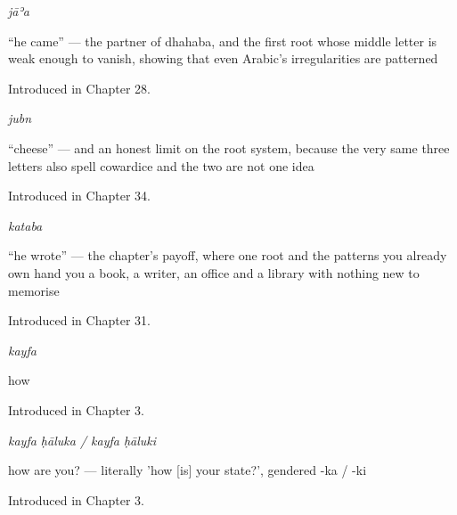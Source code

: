 \noindent\begin{minipage}[t]{\linewidth}
\raggedright
\textbf{}\enspace\emph{jāʾa}\par
\small \textquotedblleft{}he came\textquotedblright{} — the partner of dhahaba, and the first root whose middle letter is weak enough to vanish, showing that even Arabic's irregularities are patterned\par
\footnotesize Introduced in Chapter 28.
\end{minipage}\par\medskip

\noindent\begin{minipage}[t]{\linewidth}
\raggedright
\textbf{}\enspace\emph{jubn}\par
\small \textquotedblleft{}cheese\textquotedblright{} — and an honest limit on the root system, because the very same three letters also spell cowardice and the two are not one idea\par
\footnotesize Introduced in Chapter 34.
\end{minipage}\par\medskip

\noindent\begin{minipage}[t]{\linewidth}
\raggedright
\textbf{}\enspace\emph{kataba}\par
\small \textquotedblleft{}he wrote\textquotedblright{} — the chapter's payoff, where one root and the patterns you already own hand you a book, a writer, an office and a library with nothing new to memorise\par
\footnotesize Introduced in Chapter 31.
\end{minipage}\par\medskip

\noindent\begin{minipage}[t]{\linewidth}
\raggedright
\textbf{}\enspace\emph{kayfa}\par
\small how\par
\footnotesize Introduced in Chapter 3.
\end{minipage}\par\medskip

\noindent\begin{minipage}[t]{\linewidth}
\raggedright
\textbf{ }\enspace\emph{kayfa ḥāluka / kayfa ḥāluki}\par
\small how are you? — literally 'how {[}is{]} your state?', gendered -ka / -ki\par
\footnotesize Introduced in Chapter 3.
\end{minipage}\par\medskip

